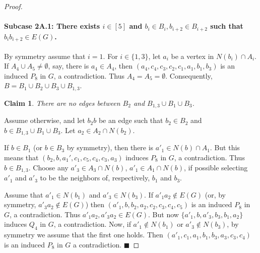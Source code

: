 \documentclass[11pt,a4paper]{article}
\theoremstyle{mystyle}
\newtheorem{claim}{Claim}[theorem]
\newenvironment{claimproof}{\noindent {\emph{Proof of Claim.}}}{\hfill$\blacksquare$\medskip}
\newcommand{\jorik}[1]{\textcolor{blue}{Comment by Jorik: #1}}
\newcommand{\prz}[2][]{\todo[color=green!70,#1]{{\textbf{prz:} #2}}}
\begin{document}
\begin{proof}

\paragraph{Subcase 2A.1: There exists $i \in [5]$ and $b_i \in B_i, b_{i+2} \in B_{i+2}$ such that $b_ib_{i+2} \in E(G)$.}
By symmetry assume that $i=1$.
For $i \in \{1,3\}$, let $a_i$ be a vertex in $N(b_i) \cap A_i$.
If $A_4 \cup A_5 \neq \emptyset$, say, there is $a_4 \in A_4$, then $(a_4,c_4,c_3,c_2,c_1,a_1,b_1,b_3)$ is an induced $P_8$ in $G$, a contradiction.
Thus $A_4=A_5=\emptyset$. Consequently, $B = B_1 \cup B_2 \cup B_3 \cup B_{1,3}$.

\begin{claim}
    There are no edges between $B_2$ and $B_{1,3} \cup B_1 \cup B_3$.
\end{claim}
\begin{claimproof}
Assume otherwise, and let $b_2b$ be an edge such that $b_2 \in B_2$ and $b \in B_{1,3} \cup B_1 \cup B_3$.
Let $a_2 \in A_2 \cap N(b_2)$.

If $b \in B_{1}$ (or $b \in B_3$ by symmetry), then there is $a'_1 \in N(b) \cap A_1$. But this means that $(b_2,b,a_1',c_1,c_5,c_4,c_3,a_3)$ induces $P_8$ in $G$, a contradiction. Thus $b \in B_{1,3}$.
Choose any $a'_3 \in A_3 \cap N(b)$, $a'_1 \in A_1 \cap N(b)$, if possible selecting $a'_1$ and $a'_3$ to be the neighbors of, respectively, $b_1$ and $b_3$.

Assume that $a'_1 \in N(b_1)$ and $a'_3 \in N(b_3)$. If $a'_1a_2 \notin E(G)$ (or, by symmetry, $a'_3a_2 \notin E(G)$) then $(a'_1,b,b_2,a_2,c_2,c_3,c_4,c_5)$ is an induced $P_8$ in $G$, a contradiction. Thus $a'_1a_2,a'_3a_2 \in E(G)$. But now $\{a'_1,b,a'_3,b_3,b_1,a_2\}$ induces $Q_4$ in $G$, a contradiction. Now, if $a'_1 \notin N(b_1)$ or $a'_3 \notin N(b_{3})$, by symmetry we assume that the first one holds. Then $(a'_1,c_1,a_1,b_1,b_3,a_3,c_3,c_4)$ is an induced $P_8$ in $G$ a contradiction.
\end{claimproof}



\end{proof}
\end{document}
